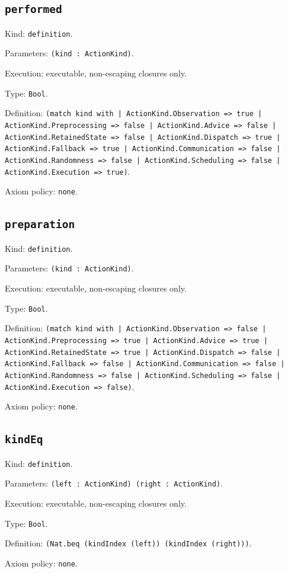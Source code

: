 \documentclass[11pt]{article}
\begin{document}
\subsection*{\texttt{performed}}
\noindent Kind: \texttt{definition}.\par
\noindent Parameters: \texttt{(kind : ActionKind)}.\par
\noindent Execution: executable, non-escaping closures only.\par
\noindent Type: \texttt{Bool}.\par
\noindent Definition: \texttt{(match kind with | ActionKind.Observation => true | ActionKind.Preprocessing => false | ActionKind.Advice => false | ActionKind.RetainedState => false | ActionKind.Dispatch => true | ActionKind.Fallback => true | ActionKind.Communication => false | ActionKind.Randomness => false | ActionKind.Scheduling => false | ActionKind.Execution => true)}.\par
\noindent Axiom policy: \texttt{none}.\par
\subsection*{\texttt{preparation}}
\noindent Kind: \texttt{definition}.\par
\noindent Parameters: \texttt{(kind : ActionKind)}.\par
\noindent Execution: executable, non-escaping closures only.\par
\noindent Type: \texttt{Bool}.\par
\noindent Definition: \texttt{(match kind with | ActionKind.Observation => false | ActionKind.Preprocessing => true | ActionKind.Advice => true | ActionKind.RetainedState => true | ActionKind.Dispatch => false | ActionKind.Fallback => false | ActionKind.Communication => false | ActionKind.Randomness => false | ActionKind.Scheduling => false | ActionKind.Execution => false)}.\par
\noindent Axiom policy: \texttt{none}.\par
\subsection*{\texttt{kindEq}}
\noindent Kind: \texttt{definition}.\par
\noindent Parameters: \texttt{(left : ActionKind) (right : ActionKind)}.\par
\noindent Execution: executable, non-escaping closures only.\par
\noindent Type: \texttt{Bool}.\par
\noindent Definition: \texttt{(Nat.beq (kindIndex (left)) (kindIndex (right)))}.\par
\noindent Axiom policy: \texttt{none}.\par
\end{document}
